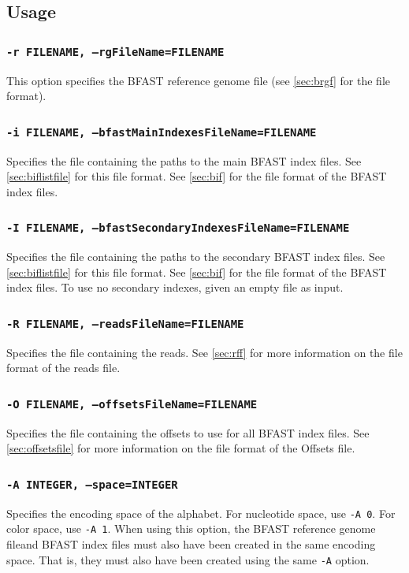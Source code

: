 \documentclass[a4paper,12pt]{book}
\newcommand{\TT}[1]{{\tt #1}} %
\newcommand{\BRGF}{BFAST reference genome file} %
\newcommand{\BIF}{BFAST index file} %
\begin{document}
\subsection{Usage}
\label{sec:bmatchesusage}

\subsubsection{\TT{-r FILENAME, --rgFileName=FILENAME}}
This option specifies the \BRGF{} (see \autoref{sec:brgf} for the file format).

\subsubsection{\TT{-i FILENAME, --bfastMainIndexesFileName=FILENAME}}
Specifies the file containing the paths to the main \BIF{s}.
See \autoref{sec:biflistfile} for this file format.
See \autoref{sec:bif} for the file format of the \BIF{s}.

\subsubsection{\TT{-I FILENAME, --bfastSecondaryIndexesFileName=FILENAME}}
Specifies the file containing the paths to the secondary \BIF{s}.
See \autoref{sec:biflistfile} for this file format.
See \autoref{sec:bif} for the file format of the \BIF{s}.
To use no secondary indexes, given an empty file as input.
\subsubsection{\TT{-R FILENAME, --readsFileName=FILENAME}}
Specifies the file containing the reads.
See \autoref{sec:rff} for more information on the file format of the reads file.

\subsubsection{\TT{-O FILENAME, --offsetsFileName=FILENAME}}
Specifies the file containing the offsets to use for all \BIF{s}.
See \autoref{sec:offsetsfile} for more information on the file format of the Offsets file.

\subsubsection{\TT{-A INTEGER, --space=INTEGER}}
Specifies the encoding space of the alphabet.
For nucleotide space, use \TT{-A 0}.
For color space, use \TT{-A 1}.
When using this option, the \BRGF and \BIF{s} must also have been created in the same encoding space.
That is, they must also have been created using the same \TT{-A} option.
\end{document}
